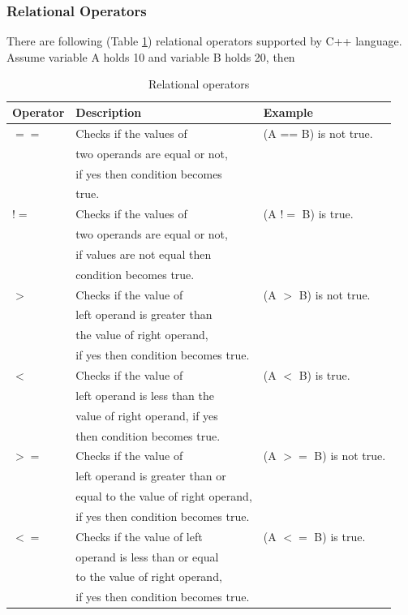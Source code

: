 \documentclass{book}
\begin{document}
\subsubsection{Relational Operators}

There are following (Table \ref{relop}) relational operators supported by C++ language. Assume variable A holds 10 and variable B holds 20, then

\begin{table}[h]
\tiny
\centering 
\begin{tabular}{lll} \hline 
Operator & Description	& Example \\ \hline 
$==$ &	Checks if the values of  &	(A == B) is not true. \\
& two operands are equal or not,  & \\
& if yes then condition becomes  & \\
& true. & \\
$!=$	& Checks if the values of  &	(A $!=$ B) is true. \\
& two operands are equal or not, & \\
& if values are not equal then  & \\
& condition becomes true. & \\ 
$>$ & Checks if the value of  & (A $>$ B) is not true. \\
& left operand is greater than  & \\
& the value of right operand,  & \\
& if yes then condition becomes true. & \\
$<$ &	Checks if the value of  &	(A $<$ B) is true. \\
& left operand is less than the  & \\
& value of right operand, if yes  & \\
& then condition becomes true. & \\
$>=$	& Checks if the value of  &	(A $>=$ B) is not true. \\
& left operand is greater than or  & \\
& equal to the value of right operand, & \\
&  if yes then condition becomes true. & \\
$<=$	& Checks if the value of left  & (A $<=$ B) is true.\\
& operand is less than or equal  & \\
& to the value of right operand,  & \\ 
& if yes then condition becomes true. & \\ \hline 
\end{tabular}
\caption{Relational operators}
\label{relop}
\end{table}
\end{document}
